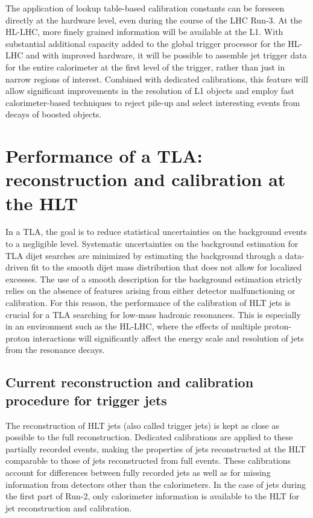\documentclass[a4paper,justified]{tufte-handout}
\begin{document}
The application of lookup table-based calibration constants can be foreseen directly at the hardware level, even during the course of the LHC Run-3. At the HL-LHC, more finely grained information will be available at the L1. With substantial additional capacity added to the global trigger processor for the HL-LHC and with improved hardware, it will be possible to assemble jet trigger data for the entire calorimeter at the first level of the trigger, rather than just in narrow regions of interest. Combined with dedicated calibrations, this feature will allow significant improvements in the resolution of L1 objects and employ fast calorimeter-based techniques to reject pile-up and select interesting events from decays of boosted objects. 

\section{Performance of a TLA: reconstruction and calibration at the HLT} \label{sec:L1Limitations}

In a TLA, the goal is to reduce statistical uncertainties on the background events to a negligible level. Systematic uncertainties on the background estimation for TLA dijet searches are minimized by estimating the background through a data-driven fit to the smooth dijet mass distribution that does not allow for localized excesses. The use of a smooth description for the background estimation strictly relies on the absence of features arising from either detector malfunctioning or calibration. For this reason, the performance of the calibration of HLT jets is crucial for a TLA searching for low-mass hadronic resonances. This is especially in an environment such as the HL-LHC, where the effects of multiple proton-proton interactions will significantly affect the energy scale and resolution of jets from the resonance decays. 

\subsection{Current reconstruction and calibration procedure for trigger jets}
\label{subsec:L1Limitations}


The reconstruction of HLT jets (also called trigger jets) is kept as close as possible to the full reconstruction. Dedicated calibrations are applied to these partially recorded events, making the properties of jets reconstructed at the HLT comparable to those of jets reconstructed from full events. These calibrations account for differences between fully recorded jets as well as for missing information from detectors other than the calorimeters. In the case of jets during the first part of Run-2, only calorimeter information is available to the HLT for jet reconstruction and calibration. 
\end{document}
